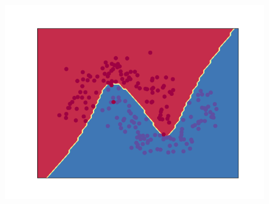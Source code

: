 \documentclass[oneside]{memoir}
\begin{document}
\begin{figure}
  \centering
  \includegraphics[scale=0.8]{decisionBoundary.png}
\end{figure}
\end{document}
